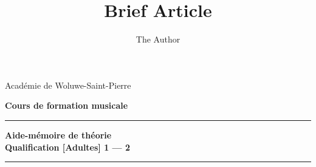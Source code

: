 \documentclass[11pt]{scrreprt}
\title{Brief Article}
\author{The Author}
\begin{document}
\thispagestyle{empty}
\begin{center}
\begin{LARGE}
Académie de Woluwe-Saint-Pierre
\end{LARGE}
\end{center}

\begin{center}
\begin{LARGE}
\textbf{Cours de formation musicale}
\end{LARGE}
\end{center}

\begin{center}
\vspace{5cm}
\noindent\rule{\textwidth}{0.5mm}
\begin{huge}
\textbf{Aide-mémoire de théorie \\
\vspace{2 cm}
 Qualification [Adultes] 1 — 2}
\end{huge}
\noindent\rule{\textwidth}{0.5mm}
\end{center}



\end{document}
